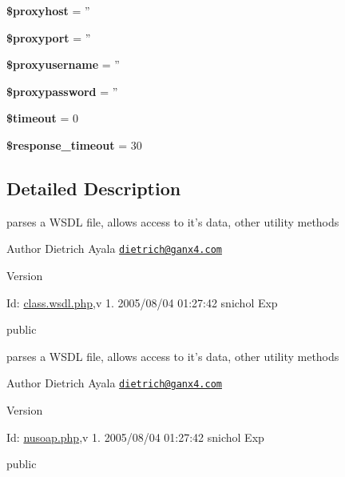 \begin{DoxyCompactItemize}
\item 
\hypertarget{classwsdl_a54407bcc777ac313a172561a8ff976c6}{{\bfseries \$proxyhost} = ''}\label{classwsdl_a54407bcc777ac313a172561a8ff976c6}

\item 
\hypertarget{classwsdl_ac396538deee1152f84f9ddabac2c2366}{{\bfseries \$proxyport} = ''}\label{classwsdl_ac396538deee1152f84f9ddabac2c2366}

\item 
\hypertarget{classwsdl_aaa30711a40f8f7bae4cd7060414e0fe1}{{\bfseries \$proxyusername} = ''}\label{classwsdl_aaa30711a40f8f7bae4cd7060414e0fe1}

\item 
\hypertarget{classwsdl_a98c0d3b74811ee643f7d1fce47f1b281}{{\bfseries \$proxypassword} = ''}\label{classwsdl_a98c0d3b74811ee643f7d1fce47f1b281}

\item 
\hypertarget{classwsdl_a84320a9bf3e591d7ae20dfcb0dfe6a0d}{{\bfseries \$timeout} = 0}\label{classwsdl_a84320a9bf3e591d7ae20dfcb0dfe6a0d}

\item 
\hypertarget{classwsdl_a17a3280264a8b9bb5ed32729d654739c}{{\bfseries \$response\-\_\-timeout} = 30}\label{classwsdl_a17a3280264a8b9bb5ed32729d654739c}

\end{DoxyCompactItemize}


\subsection{Detailed Description}
parses a W\-S\-D\-L file, allows access to it's data, other utility methods

\begin{DoxyAuthor}{Author}
Dietrich Ayala \href{mailto:dietrich@ganx4.com}{\tt dietrich@ganx4.\-com} 
\end{DoxyAuthor}
\begin{DoxyVersion}{Version}

\end{DoxyVersion}
\begin{DoxyParagraph}{Id\-:}
\hyperlink{class_8wsdl_8php_source}{class.\-wsdl.\-php},v 1. 2005/08/04 01\-:27\-:42 snichol Exp 
\end{DoxyParagraph}
public

parses a W\-S\-D\-L file, allows access to it's data, other utility methods

\begin{DoxyAuthor}{Author}
Dietrich Ayala \href{mailto:dietrich@ganx4.com}{\tt dietrich@ganx4.\-com} 
\end{DoxyAuthor}
\begin{DoxyVersion}{Version}

\end{DoxyVersion}
\begin{DoxyParagraph}{Id\-:}
\hyperlink{nusoap_8php_source}{nusoap.\-php},v 1. 2005/08/04 01\-:27\-:42 snichol Exp 
\end{DoxyParagraph}
public 

